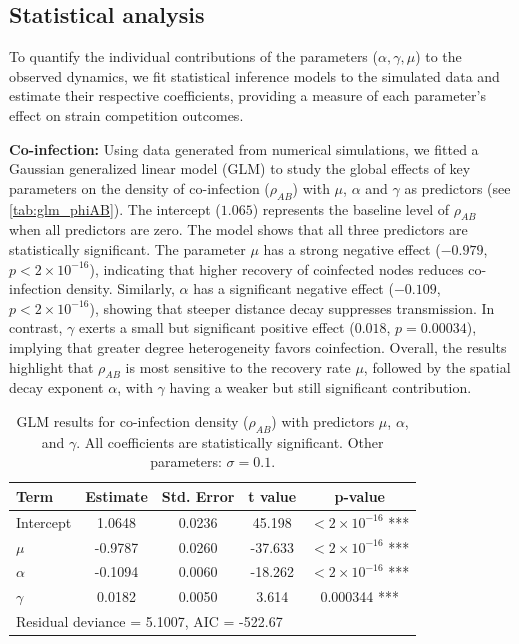 \documentclass[a4paper,12pt]{scrartcl}
\theoremstyle{plain}%
\theoremstyle{definition}
\theoremstyle{remark}
\numberwithin{equation}{section}
\begin{document}
\subsection{Statistical analysis}


To quantify the individual contributions of the parameters ($\alpha, \gamma,\mu$) to the observed dynamics, we fit statistical inference models to the simulated data and estimate their respective coefficients, providing a measure of each parameter's effect on strain competition outcomes.

\textbf{Co-infection:} Using data generated from numerical simulations, we fitted a Gaussian generalized linear model (GLM) to study the global effects of key parameters on the density of co-infection (\(\rho_{AB}\)) with \(\mu\), \(\alpha\) and \(\gamma\) as predictors (see \autoref{tab:glm_phiAB}). The intercept (\(1.065\)) represents the baseline level of \(\rho_{AB}\) when all predictors are zero.  The model shows that all three predictors are statistically significant.  
The parameter \(\mu\) has a strong negative effect (\(-0.979\), \(p<2\times10^{-16}\)), indicating that higher recovery of coinfected nodes reduces co-infection density. Similarly, \(\alpha\) has a significant negative effect (\(-0.109\), \(p<2\times10^{-16}\)), showing that steeper distance decay suppresses transmission. In contrast, \(\gamma\) exerts a small but significant positive effect (\(0.018\), \(p=0.00034\)), implying that greater degree heterogeneity favors coinfection.  Overall, the results highlight that \(\rho_{AB}\) is most sensitive to the recovery rate \(\mu\), followed by the spatial decay exponent \(\alpha\), with \(\gamma\) having a weaker but still significant contribution.

\begin{table}[ht]
\centering
\caption{GLM results for co-infection density ($\rho_{AB}$) with predictors $\mu$, $\alpha$, and $\gamma$. All coefficients are statistically significant. Other parameters: $\sigma = 0.1$.}
\label{tab:glm_phiAB}
\begin{tabular}{lcccc}
\hline
\textbf{Term} & \textbf{Estimate} & \textbf{Std. Error} & \textbf{t value} & \textbf{p-value} \\
\hline
Intercept & 1.0648 & 0.0236 & 45.198 & $<2\times10^{-16}$ *** \\
$\mu$     & -0.9787 & 0.0260 & -37.633 & $<2\times10^{-16}$ *** \\
$\alpha$  & -0.1094 & 0.0060 & -18.262 & $<2\times10^{-16}$ *** \\
$\gamma$  & 0.0182 & 0.0050 & 3.614 & 0.000344 *** \\
\hline
\multicolumn{5}{l}{\footnotesize Residual deviance = 5.1007, AIC = -522.67}
\end{tabular}
\end{table}
\end{document}
